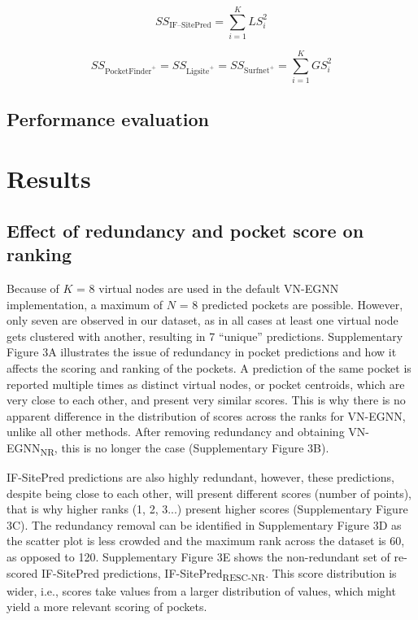 \begin{equation}
SS_{\text{IF--SitePred}} = \sum_{i=1}^{K} LS_i^2
\label{eq:IFSP_pocket_score}
\end{equation}

\begin{equation}
SS_{\text{PocketFinder}^+} = SS_{\text{Ligsite}^+} = SS_{\text{Surfnet}^+} = \sum_{i=1}^{K} GS_i^2
\label{eq:leagcy_methos_pocket_score}
\end{equation}

\subsection{Performance evaluation}

\FloatBarrier

\section{Results}

\subsection{Effect of redundancy and pocket score on ranking}

Because of $K$ = 8 virtual nodes are used in the default VN-EGNN implementation, a maximum of $N$ = 8 predicted pockets are possible. However, only seven are observed in our dataset, as in all cases at least one virtual node gets clustered with another, resulting in 7 ``unique'' predictions. Supplementary Figure 3A illustrates the issue of redundancy in pocket predictions and how it affects the scoring and ranking of the pockets. A prediction of the same pocket is reported multiple times as distinct virtual nodes, or pocket centroids, which are very close to each other, and present very similar scores. This is why there is no apparent difference in the distribution of scores across the ranks for VN-EGNN, unlike all other methods. After removing redundancy and obtaining VN-EGNN\textsubscript{NR}, this is no longer the case (Supplementary Figure 3B).

IF-SitePred predictions are also highly redundant, however, these predictions, despite being close to each other, will present different scores (number of points), that is why higher ranks (1, 2, 3...) present higher scores (Supplementary Figure 3C). The redundancy removal can be identified in Supplementary Figure 3D as the scatter plot is less crowded and the maximum rank across the dataset is 60, as opposed to 120. Supplementary Figure 3E shows the non-redundant set of re-scored IF-SitePred predictions, IF-SitePred\textsubscript{RESC-NR}. This score distribution is wider, i.e., scores take values from a larger distribution of values, which might yield a more relevant scoring of pockets.

